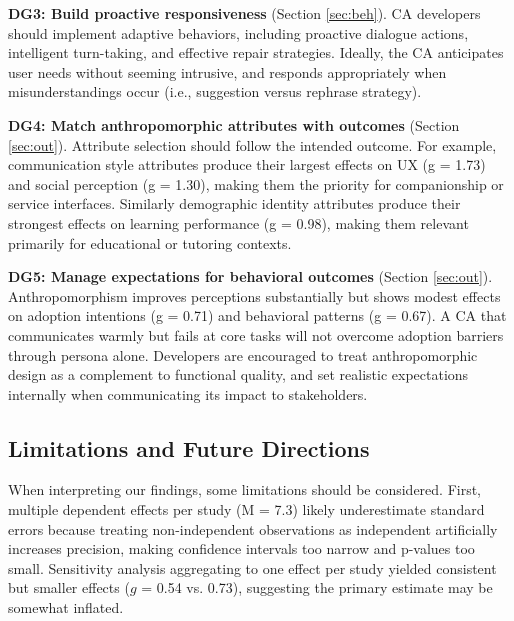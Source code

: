 \documentclass[manuscript,screen,review,anonymous]{acmart}
\DeclareRobustCommand{\change}[1]{%
    \textcolor{changeblue}{#1}%
  }
\DeclareRobustCommand{\change}[1]{#1}
\begin{document}
\textbf{DG3: Build proactive responsiveness} (Section \ref{sec:beh}). CA developers should implement adaptive behaviors, including proactive dialogue actions, intelligent turn-taking, and effective repair strategies. Ideally, the CA anticipates user needs without seeming intrusive, and responds appropriately when misunderstandings occur (i.e., suggestion versus rephrase strategy).

\textbf{DG4: Match anthropomorphic attributes with outcomes} (Section \ref{sec:out}). \change{Attribute selection should follow the intended outcome. For example, communication style attributes produce their largest effects on UX (g = 1.73) and social perception (g = 1.30), making them the priority for companionship or service interfaces. Similarly demographic identity attributes produce their strongest effects on learning performance (g = 0.98), making them relevant primarily for educational or tutoring contexts.}


\textbf{DG5: Manage expectations for behavioral outcomes} (Section \ref{sec:out}). \change{Anthropomorphism improves perceptions substantially but shows modest effects on adoption intentions (g = 0.71) and behavioral patterns (g = 0.67). A CA that communicates warmly but fails at core tasks will not overcome adoption barriers through persona alone. Developers are encouraged to treat anthropomorphic design as a complement to functional quality, and set realistic expectations internally when communicating its impact to stakeholders.}

\subsection{Limitations and Future Directions}
When interpreting our findings, some limitations should be considered. First, multiple dependent effects per study (M = 7.3) likely underestimate standard errors because treating non-independent observations as independent artificially increases precision, making confidence intervals too narrow and p-values too small. Sensitivity analysis aggregating to one effect per study yielded consistent but smaller effects ($g$ = 0.54 vs. 0.73), suggesting the primary estimate may be somewhat inflated. 
\end{document}
